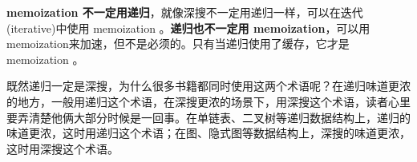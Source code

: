 \textbf{memoization 不一定用递归}，就像深搜不一定用递归一样，可以在迭代(iterative)中使用 memoization 。\textbf{递归也不一定用 memoization}，可以用memoization来加速，但不是必须的。只有当递归使用了缓存，它才是 memoization 。

既然递归一定是深搜，为什么很多书籍都同时使用这两个术语呢？在递归味道更浓的地方，一般用递归这个术语，在深搜更浓的场景下，用深搜这个术语，读者心里要弄清楚他俩大部分时候是一回事。在单链表、二叉树等递归数据结构上，递归的味道更浓，这时用递归这个术语；在图、隐式图等数据结构上，深搜的味道更浓，这时用深搜这个术语。
